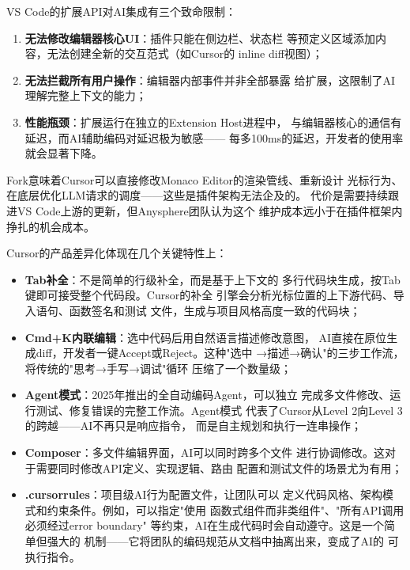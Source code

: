\begin{whybox}
VS Code的扩展API对AI集成有三个致命限制：
\begin{enumerate}
  \item \textbf{无法修改编辑器核心UI}：插件只能在侧边栏、状态栏
    等预定义区域添加内容，无法创建全新的交互范式（如Cursor的
    inline diff视图）；
  \item \textbf{无法拦截所有用户操作}：编辑器内部事件并非全部暴露
    给扩展，这限制了AI理解完整上下文的能力；
  \item \textbf{性能瓶颈}：扩展运行在独立的Extension Host进程中，
    与编辑器核心的通信有延迟，而AI辅助编码对延迟极为敏感——
    每多100ms的延迟，开发者的使用率就会显著下降。
\end{enumerate}
Fork意味着Cursor可以直接修改Monaco Editor的渲染管线、重新设计
光标行为、在底层优化LLM请求的调度——这些是插件架构无法企及的。
代价是需要持续跟进VS Code上游的更新，但Anysphere团队认为这个
维护成本远小于在插件框架内挣扎的机会成本。
\end{whybox}

Cursor的产品差异化体现在几个关键特性上：

\begin{itemize}
  \item \textbf{Tab补全}：不是简单的行级补全，而是基于上下文的
    多行代码块生成，按Tab键即可接受整个代码段。Cursor的补全
    引擎会分析光标位置的上下游代码、导入语句、函数签名和测试
    文件，生成与项目风格高度一致的代码块；
  \item \textbf{Cmd+K内联编辑}：选中代码后用自然语言描述修改意图，
    AI直接在原位生成diff，开发者一键Accept或Reject。这种"选中
    →描述→确认"的三步工作流，将传统的"思考→手写→调试"循环
    压缩了一个数量级；
  \item \textbf{Agent模式}：2025年推出的全自动编码Agent，可以独立
    完成多文件修改、运行测试、修复错误的完整工作流。Agent模式
    代表了Cursor从Level 2向Level 3的跨越——AI不再只是响应指令，
    而是自主规划和执行一连串操作；
  \item \textbf{Composer}：多文件编辑界面，AI可以同时跨多个文件
    进行协调修改。这对于需要同时修改API定义、实现逻辑、路由
    配置和测试文件的场景尤为有用；
  \item \textbf{.cursorrules}：项目级AI行为配置文件，让团队可以
    定义代码风格、架构模式和约束条件。例如，可以指定"使用
    函数式组件而非类组件"、"所有API调用必须经过error boundary"
    等约束，AI在生成代码时会自动遵守。这是一个简单但强大的
    机制——它将团队的编码规范从文档中抽离出来，变成了AI的
    可执行指令。
\end{itemize}

